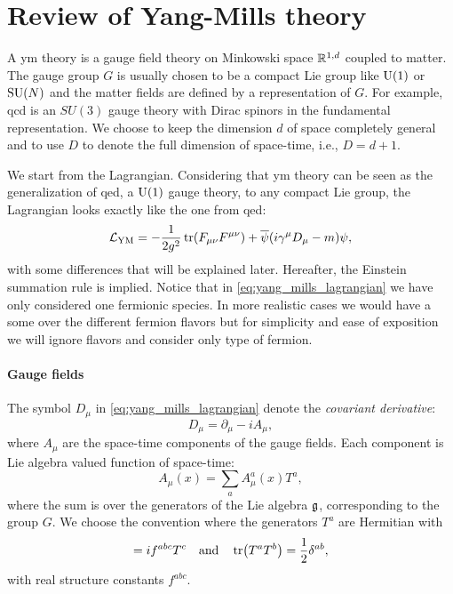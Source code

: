 \section{Review of Yang-Mills theory}
\label{sec:yang_mills_theory}

A \ac{ym} theory is a gauge field theory on Minkowski space $\mathbb{R}^{1,d}$ coupled to matter.
    The gauge group $G$ is usually chosen to be a compact Lie group like $\mathrm{U}(1)$ or $\text{SU}(N)$ and the matter fields are defined by a representation of $G$.
    For example, \ac{qcd} is an $SU(3)$ gauge theory with Dirac spinors in the fundamental representation.
We choose to keep the dimension $d$ of space completely general and to use $D$ to denote the full dimension of space-time, i.e., $D=d+1$.

We start from the Lagrangian.
Considering that \ac{ym} theory can be seen as the generalization of \ac{qed}, a $\mathrm{U}(1)$ gauge theory, to any compact Lie group, the Lagrangian looks exactly like the one from \ac{qed}:
\begin{equation}
    \mathcal{L}_{\text{YM}} = - \frac{1}{2 g^2} \tr(F_{\mu \nu} F^{\mu \nu}) + \overline{\psi} \qty( i \gamma^{\mu} D_{\mu} - m ) \psi,
    \label{eq:yang_mills_lagrangian}
\end{equation}
with some differences that will be explained later.
Hereafter, the Einstein summation rule is implied.
Notice that in \eqref{eq:yang_mills_lagrangian} we have only considered one fermionic species.
In more realistic cases we would have a some over the different fermion flavors but for simplicity and ease of exposition we will ignore flavors and consider only type of fermion.




\paragraph*{Gauge fields}

The symbol $D_{\mu}$ in \eqref{eq:yang_mills_lagrangian} denote the \emph{covariant derivative}:
\begin{equation}
    D_{\mu} = \partial_{\mu} - i A_{\mu},
    \label{eq:covariant_derivative}
\end{equation}
where $A_{\mu}$ are the space-time components of the gauge fields.
Each component is Lie algebra valued function of space-time:
\begin{equation}
    A_{\mu}(x) = \sum_{a} A_{\mu}^a(x) T^a,
\end{equation}
where the sum is over the generators of the Lie algebra $\mathfrak{g}$, corresponding to the group $G$.
We choose the convention where the generators $T^a$ are Hermitian with
\begin{equation}
    [T^a, T^b] = i f^{abc} T^c
    \qand
    \tr(T^a T^b) = \frac{1}{2} \delta^{ab},
\end{equation}
with real structure constants $f^{abc}$.


